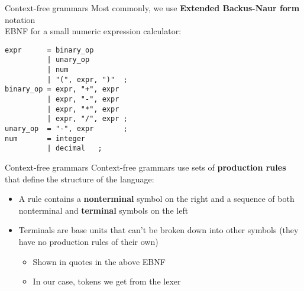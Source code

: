 \documentclass[../index.tex]{subfiles}
\begin{document}
\renewcommand{\currenttitle}{Context-free grammars}
\begin{frame}[fragile]{\currenttitle}
  \vspace*{1em}
  Most commonly, we use \textbf{Extended Backus-Naur form} notation \\[1.5em]

  EBNF for a small numeric expression calculator: \\[1em]

  \begin{lstlisting}[xleftmargin=2em]
expr      = binary_op
          | unary_op
          | num
          | "(", expr, ")"  ;
binary_op = expr, "+", expr
          | expr, "-", expr
          | expr, "*", expr
          | expr, "/", expr ;
unary_op  = "-", expr       ;
num       = integer
          | decimal   ;
  \end{lstlisting}
\end{frame}

\begin{frame}[fragile]{\currenttitle}
  Context-free grammars use sets of \textbf{production rules} that define the
  structure of the language:
  \begin{itemize}
    \item<+-> A rule contains a \textbf{nonterminal} symbol on the right and a
      sequence of both nonterminal and \textbf{terminal} symbols on the left
    \item<+-> Terminals are base units that can't be broken down into other symbols
      (they have no production rules of their own)
      \begin{itemize}
        \item Shown in quotes in the above EBNF
        \item In our case, tokens we get from the lexer
      \end{itemize}
  \end{itemize}
\end{frame}
\end{document}
